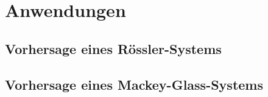\section{Anwendungen}
\subsection{Vorhersage eines Rössler-Systems}

\subsection{Vorhersage eines Mackey-Glass-Systems}